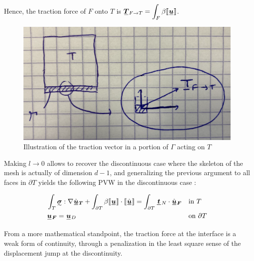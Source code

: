 \documentclass[fleqn]{article}
\begin{document}
            Hence, the traction force of $F$ onto $T$ is $\displaystyle \tensori{T}\subscript{F \rightarrow T} = \int_F \beta \llbracket \tensori{u} \rrbracket$.

            \begin{figure}[h]
                \centering
                \includegraphics[width=10.cm]{img/traction.png}
                \caption{Illustration of the traction vector in a portion of $\Gamma$ acting on $T$}
                \label{fig_traction}
            \end{figure}
            
            Making $l \rightarrow 0$ allows to recover the discontinuous case where the skeleton of the mesh is actually of dimension $d-1$, and generalizing the previous argument to all faces in $\partial T$ yields the following PVW in the discontinuous case :

            \begin{equation}
                \begin{aligned}
                    &
                    \int_T \tensorii{\sigma} : \nabla \hat{\tensori{u}}\subscript{\bm{T}} + \int_{\partial T} \beta \llbracket \tensori{u} \rrbracket \cdot \llbracket \hat{\tensori{u}} \rrbracket
                    =
                    \int_{\partial T} \tensori{t}\subscript{N} \cdot \hat{\tensori{u}}\subscript{\bm{F}}
                    &&
                    \mbox{in $T$}
                    \\
                    &
                    \tensori{u}\subscript{\bm{F}} = \tensori{u}\subscript{D}
                    &&
                    \mbox{on $\partial T$}
                \end{aligned}
            \end{equation}

            From a more mathematical standpoint, the traction force at the interface is a weak form of continuity, through a penalization in the least square sense of the displacement jump at the discontinuity. 
\end{document}

